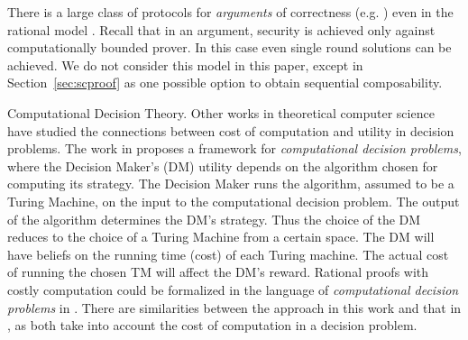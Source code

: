 \medskip
{}
There is a large class of protocols for {\em arguments} of correctness (e.g. \cite{ggp10,ggpr13,krr14}) even in the rational model \cite{ratargs,ratsumchecks}. Recall that in an argument, security is achieved only against computationally bounded prover. In this case even single round solutions can be achieved. We do not consider this model in this paper, except in Section~\ref{sec:scproof} as one possible option to obtain sequential composability. 

\medskip
\noindent
{\sc Computational Decision Theory.}
Other works in theoretical computer science have studied the connections between cost of computation and utility in decision problems.
The work in \cite{halpern2011don} proposes a framework for \emph{computational decision problems}, where the Decision Maker's (DM) utility depends on the algorithm chosen for computing its strategy.
The Decision Maker runs the algorithm, assumed to be a Turing Machine, on the input to the computational decision problem.
The output of the algorithm determines the DM's strategy. 
Thus the choice of the DM reduces to the choice of a Turing Machine from a certain space. The DM will have beliefs on the running time (cost) of each Turing machine. The actual cost of running the chosen TM will affect the DM's reward.
Rational proofs with costly computation could be formalized in the language of \emph{computational decision problems} in \cite{halpern2011don}. There are similarities between the approach in this
work and that in \cite{halpern2011don}, as both take into account the cost of computation in a decision problem.


